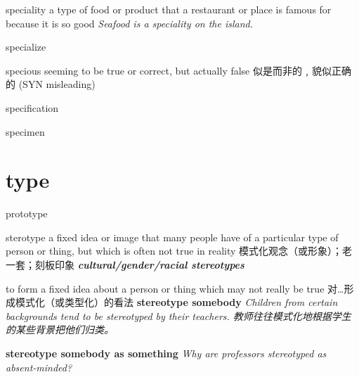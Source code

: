 \begin{RefWord}{speciality}
    a type of food or product that a restaurant or place is famous for because it is so good
    \textit{Seafood is a speciality on the island.}
\end{RefWord}

\begin{RefWord}{specialize}
\end{RefWord}

\begin{RefWord}{specious}
    seeming to be true or correct, but actually false 似是而非的﹐貌似正确的 (SYN  misleading)
\end{RefWord}

\begin{RefWord}{specification}
\end{RefWord}

\begin{RefWord}{specimen}
\end{RefWord}

\section{type}

\begin{RefWord}{prototype}
\end{RefWord}

\begin{RefWord}{sterotype}
    a fixed idea or image that many people have of a particular type of person or thing, but which is often not true in reality  模式化观念（或形象）；老一套；刻板印象
    \textit{\textbf{cultural/gender/racial stereotypes}}

    to form a fixed idea about a person or thing which may not really be true 对…形成模式化（或类型化）的看法
    \textbf{stereotype somebody} \textit{Children from certain backgrounds tend to be stereotyped by their teachers. 教师往往模式化地根据学生的某些背景把他们归类。}

    \textbf{stereotype somebody as something} \textit{Why are professors stereotyped as absent-minded?}
\end{RefWord}


